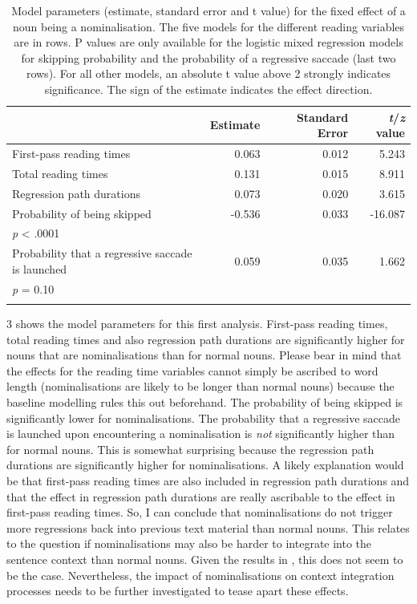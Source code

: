\documentclass[output=paper]{langsci/langscibook}
\begin{document}
\begin{table}
\begin{tabularx}{\textwidth}{Xrrr}
\lsptoprule
 & Estimate & Standard Error & \textit{t}/\textit{z} value\\
\midrule 
 First-pass reading times & 0.063 & 0.012 & 5.243\\
 Total reading times & 0.131 & 0.015 & 8.911\\
 Regression path durations & 0.073 & 0.020 & 3.615\\
 Probability of being skipped & {}-0.536 & 0.033 & {}-16.087\\
\textit{p} {\textless} .0001\\
 Probability that a regressive saccade is launched & 0.059 & 0.035 & 1.662\\
\textit{p} = 0.10\\
\lspbottomrule
\end{tabularx}
\caption{Model parameters (estimate, standard error and t value) for the fixed effect of a noun being a nominalisation. The five models for the different reading variables are in rows. P values are only available for the logistic mixed regression models for skipping probability and the probability of a regressive saccade (last two rows). For all other models, an absolute t value above 2 strongly indicates significance. The sign of the estimate indicates the effect direction.}
\label{wolfer:tab:3}
\end{table}
3 shows the model parameters for this first analysis. First-pass reading times, total reading times and also regression path durations are significantly higher for nouns that are nominalisations than for normal nouns. Please bear in mind that the effects for the reading time variables cannot simply be ascribed to word length (nominalisations are likely to be longer than normal nouns) because the baseline modelling rules this out beforehand. The probability of being skipped is significantly lower for nominalisations. The probability that a regressive saccade is launched upon encountering a nominalisation is \textit{not} significantly higher than for normal nouns. This is somewhat surprising because the regression path durations are significantly higher for nominalisations. A likely explanation would be that first-pass reading times are also included in regression path durations and that the effect in regression path durations are really ascribable to the effect in first-pass reading times. So, I can conclude that nominalisations do not trigger more regressions back into previous text material than normal nouns. This relates to the question if nominalisations may also be harder to integrate into the sentence context than normal nouns. Given the results in , this does not seem to be the case. Nevertheless, the impact of nominalisations on context integration processes needs to be further investigated to tease apart these effects.
\end{document}
